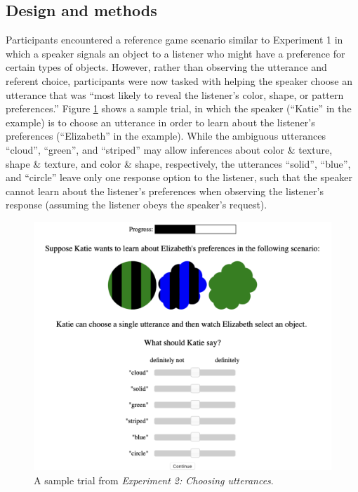 \documentclass[11pt,a4paper]{article}
\begin{document}
\subsection{Design and methods}

Participants encountered a reference game scenario similar to Experiment 1 in which a speaker signals an object to a listener who might have a preference for certain types of objects. However, rather than observing the utterance and referent choice, participants were now tasked with helping the speaker choose an utterance that was ``most likely to reveal the listener's color, shape, or pattern preferences.'' Figure \ref{exp2-trial} shows a sample trial, in which the speaker (``Katie'' in the example) is to choose an utterance in order to learn about the listener's preferences (``Elizabeth'' in the example). While the ambiguous utterances ``cloud'', ``green'', and ``striped'' may allow inferences about color \& texture, shape \& texture, and color \& shape, respectively, the utterances ``solid'', ``blue'', and ``circle'' leave only one response option to the listener, such that the speaker cannot learn about the listener's preferences when observing the listener's response (assuming the listener obeys the speaker's request).  


\begin{figure}[ht]
	\centering
	\includegraphics[width=4.5in]{images/utterance-choice-trial.png}
	\caption{A sample trial from \emph{Experiment 2: Choosing utterances}. }\label{exp2-trial}
\end{figure} 
\end{document}
